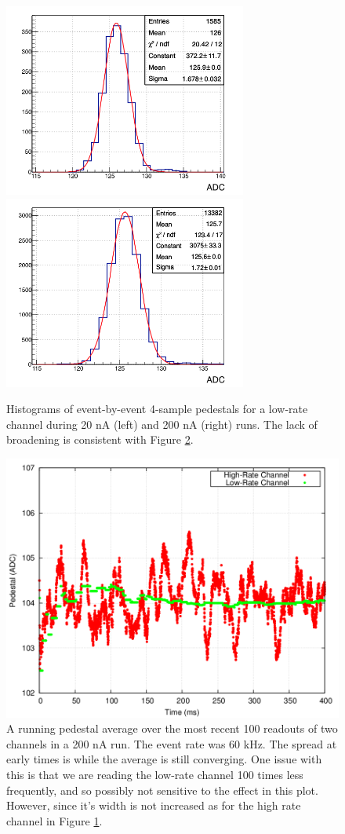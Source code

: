 \documentclass[amsmath,amssymb,notitlepage,12pt]{revtex4-1}
\begin{document}
\begin{figure}[htbp]\centering
    \includegraphics[width=8cm]{pics/20nA_00_00.png}
    \includegraphics[width=8cm]{pics/200nA_00_00.png}
    \caption{Histograms of event-by-event 4-sample pedestals for a low-rate channel during 20 nA (left) and 200 nA (right) runs.  The lack of broadening is consistent with Figure \ref{fig:pedevt}.\label{fig:pedwidthlo}}
\end{figure}


\begin{figure}[htbp]\centering
    \includegraphics[width=12cm]{pics/3431_ped_vs_time4.png}
    \caption{A running pedestal average over the most recent 100 readouts of two channels in a 200 nA run.  The event rate was 60 kHz.  The spread at early times is while the average is still converging.  One issue with this is that we are reading the low-rate channel 100 times less frequently, and so possibly not sensitive to the effect in this plot.  However, since it's width is not increased as for the high rate channel in Figure \ref{fig:pedwidthlo}.
    \label{fig:pedevt}}
\end{figure}
\end{document}
